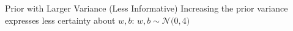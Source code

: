 \documentclass{beamer}
\begin{document}
\begin{frame}{Prior with Larger Variance (Less Informative)}
  Increasing the prior variance expresses less certainty about \(w, b\):
  \(
    w, b \sim \mathcal{N}\big(0, 4\big)
  \)

  \begin{center}
  \end{center}
\end{frame}

\end{document}
